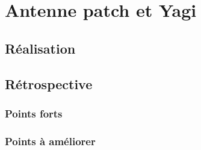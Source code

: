 \chapter{Antenne patch et Yagi}
\label{chap:antennes}

\section{Réalisation}



\section{Rétrospective}

\subsection{Points forts}



\subsection{Points à améliorer}
